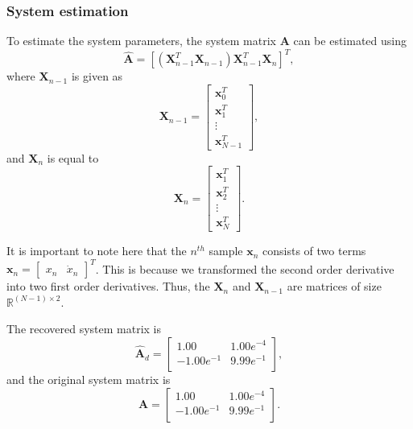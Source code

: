 \documentclass{article}
\begin{document}
\subsubsection{System estimation}
To estimate the system parameters, the system matrix $\mathbf{A}$ can be estimated using
\begin{equation}
\hat{\mathbf{A}} = \left[ \left( \mathbf{X}_{n-1}^{T} \mathbf{X}_{n-1} \right) \mathbf{X}_{n-1}^{T} \mathbf{X}_{n} \right]^T,
\end{equation}
where $\mathbf{X}_{n-1}$ is given as
\begin{equation}
\mathbf{X}_{n-1} = 
\begin{bmatrix}
\mathbf{x}_0^T \\
\mathbf{x}_1^T  \\
\vdots \\
\mathbf{x}_{N-1}^T 
\end{bmatrix},
\end{equation}
and $\mathbf{X}_{n}$ is equal to
\begin{equation}
\mathbf{X}_{n} = 
\begin{bmatrix}
\mathbf{x}_1^T \\
\mathbf{x}_2^T  \\
\vdots \\
\mathbf{x}_{N}^T 
\end{bmatrix}.
\end{equation}

It is important to note here that the $n^{th}$ sample $\mathbf{x}_{n}$ consists of two terms $\mathbf{x}_{n} = \begin{bmatrix} x_{n} & \dot{x}_{n} \end{bmatrix}^T$. This is because we transformed the second order derivative into two first order derivatives. Thus, the $\mathbf{X}_{n}$ and $\mathbf{X}_{n-1}$ are matrices of size $\mathbb{R}^{\left(N-1\right) \times 2}$.

The recovered system matrix is
\begin{equation}
\hat{\mathbf{A}}_d = 
\begin{bmatrix}
1.00 &  1.00e^{-4} \\
-1.00e^{-1} &  9.99e^{-1} \\
\end{bmatrix},
\end{equation}
and the original system matrix is
\begin{equation}
\mathbf{A} = 
\begin{bmatrix}
1.00 &  1.00e^{-4} \\
-1.00e^{-1} & 9.99e^{-1} \\
\end{bmatrix}.
\end{equation}
\end{document}
